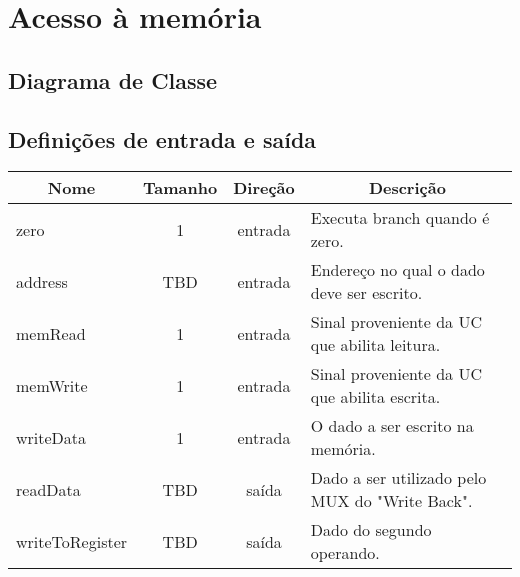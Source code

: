\section{Acesso à memória}
	\subsection{Diagrama de Classe}
		\begin{center}
	\end{center}

\subsection{Definições de entrada e saída}

	\begin{center}
        \begin{longtable}[pos]{| l | c | c | m{7cm} |} \hline
          \multicolumn{1}{|c|}{\cellcolor[gray]{0.9}\textbf{Nome}} & 
          \multicolumn{1}{c|}{\cellcolor[gray]{0.9}\textbf{Tamanho}} & 
          \multicolumn{1}{c|}{\cellcolor[gray]{0.9}\textbf{Direção}} &
          \multicolumn{1}{c|}{\cellcolor[gray]{0.9}\textbf{Descrição}} \\ \hline
          \endhead
          \hline
          \endlastfoot

          zero          	       & 1   & entrada   & Executa branch quando é zero.    \\ \hline
          address                  & TBD & entrada   & Endereço no qual o dado deve ser escrito.    \\ \hline
          memRead                  & 1   & entrada   & Sinal proveniente da UC que abilita leitura.    \\ \hline
          memWrite                 & 1   & entrada   & Sinal proveniente da UC que abilita escrita.    \\ \hline
          writeData      		   & 1   & entrada   & O dado a ser escrito na memória. \\ \hline
          readData	               & TBD & saída     & Dado a ser utilizado pelo MUX do "Write Back".    \\ \hline
          writeToRegister          & TBD & saída     & Dado do segundo operando.    \\
        \end{longtable}
      \end{center}